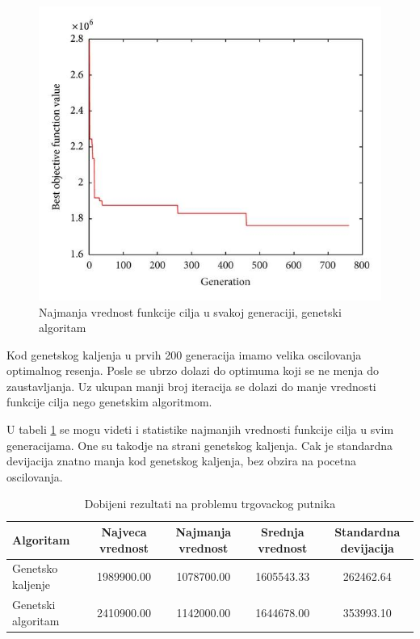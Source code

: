 \documentclass[a4paper]{article}
\begin{document}
\newpage
\begin{figure}[h!]
\centering
\includegraphics[scale= 0.4]{LIRP_Grafik_Genetski_Algoritam}
\caption{Najmanja vrednost funkcije cilja u svakoj generaciji, genetski algoritam}

\label{fig:4}
\end{figure}

Kod genetskog kaljenja u prvih 200 generacija imamo velika oscilovanja optimalnog resenja. Posle se ubrzo dolazi do optimuma koji se ne menja do zaustavljanja. Uz ukupan manji broj iteracija se dolazi do manje vrednosti funkcije cilja nego genetskim algoritmom.

U tabeli \ref{tabela:2} se mogu videti i statistike najmanjih vrednosti funkcije cilja u svim generacijama. One su takodje na strani genetskog kaljenja. Cak je standardna devijacija znatno manja kod genetskog kaljenja, bez obzira na pocetna oscilovanja.

\begin{table}[ht]
\begin{center}
\begin{tabular}{|l|c|c|c|c|} \hline
     Algoritam & Najveca vrednost & Najmanja vrednost & Srednja vrednost & Standardna devijacija \\ \hline
     Genetsko kaljenje &  1989900.00 & 1078700.00 & 1605543.33	& 262462.64 \\ \hline
     Genetski algoritam & 2410900.00 & 1142000.00 & 1644678.00 & 353993.10 \\ \hline
\end{tabular}
\end{center}
\label{tabela:2}
\caption{Dobijeni rezultati na problemu trgovackog putnika}
\end{table}
\end{document}
